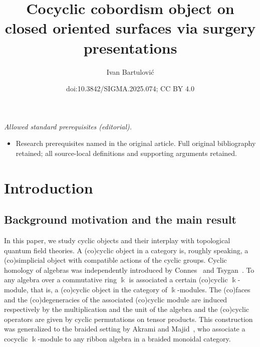 \documentclass[10pt,a4paper]{amsart}
\title{Cocyclic cobordism object on closed oriented surfaces via surgery presentations}
\author{Ivan Bartulović}
\date{doi:10.3842/SIGMA.2025.074; CC BY 4.0}
\numberwithin{equation}{section}
\newcommand{\kk}{\Bbbk}
\begin{document}
\maketitle
\noindent\textit{Allowed standard prerequisites (editorial).}\begin{itemize}
\item Research prerequisites named in the original article. Full original bibliography retained; all source-local definitions and supporting arguments retained.
\end{itemize}\medskip
\section{Introduction}

\subsection{Background motivation and the main result} In this paper, we study cyclic objects and their interplay with topological quantum field theories.
A (co)cyclic object in a category is, roughly speaking, a (co)simplicial object with
compatible actions of the cyclic groups. Cyclic homology of algebras was independently introduced by Connes~\cite{connes_non-commutative_1985} and Tsygan~\cite{tsygan}. To any algebra over a commutative ring $\kk$ is associated a certain (co)cyclic $\kk$-module, that is, a (co)cyclic object in the category of $\kk$-modules. The (co)faces and the (co)degeneracies of the associated (co)cyclic module are induced respectively by the multiplication and the unit of the algebra and the (co)cyclic operators are given by cyclic permutations on tensor products.
This construction was generalized to the braided setting by Akrami and Majid~\cite{cycliccocycles}, who associate a cocyclic $\kk$-module to any ribbon algebra in a braided monoidal category.
\end{document}
